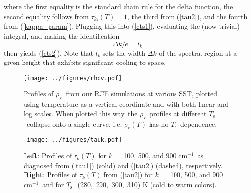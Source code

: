 \documentclass[10pt]{article}
\newcommand{\beqn}{\begin{equation}}
\newcommand{\eeqn}{\end{equation}}
\newcommand{\eqnref}[1]{(\ref{#1})}
\newcommand{\n}{\nonumber}
\newcommand{\der}[2]{\ensuremath{\frac{d #1}{d #2}}}
\newcommand{\ppz}{\ensuremath{\partial_z}}
\newcommand{\cminverse}{\ensuremath{\mathrm{cm^{-1}}}}
\newcommand{\rhov}{\ensuremath{\rho_\mathrm{v}}}
\newcommand{\Ts}{\ensuremath{T_\mathrm{s}}}
\newcommand{\gammaav}{\ensuremath{\Gamma_\mathrm{av}}}
\newcommand{\Kinverse}{\ensuremath{\mathrm{K^{-1}}}}
\begin{document}
where the first equality is the standard chain rule for the delta function, the second equality follows from $\tau_{k_1}(T)=1$, the third from \eqnref{tau2}, and the fourth from \eqnref{kappa_param}. Plugging this into \eqnref{cts1}, evaluating the (now trivial) integral, and making the identification 
	\beqn
		\Delta k/e = l_k
		\n
		\label{Deltak}
	\eeqn
	then yields \eqnref{cts2}. Note that $l_k$ sets the width $\Delta k$ of the spectral region at a given height that exhibits significant cooling to space.



	
\pagebreak

\begin{figure}[h]
	\begin{center}
			\texttt{[image: ../figures/rhov.pdf]}
		\caption{Profiles of \rhov\ from our RCE simulations at various SST, plotted using temperature as a vertical coordinate and with both linear and log scales. When plotted this way, the \rhov\ profiles at different \Ts\ collapse onto a single curve, i.e. $\rhov(T)$ has no \Ts\ dependence. 
		\label{rhov_fig}
		}
	\end{center}
\end{figure}


\begin{figure}[h]
	\begin{center}
			\texttt{[image: ../figures/tauk.pdf]}
		\caption{\textbf{Left}: Profiles of $\tau_k(T)$ for $k=$ 100, 500, and 900 \cminverse\ as diagnosed from \eqnref{tau1} (solid) and \eqnref{tau2} (dashed), respectively. \textbf{Right}: Profiles of $\tau_k(T)$ from \eqnref{tau2} for $k=$ 100, 500, and 900 \cminverse\ and for \Ts=(280,\ 290,\ 300,\ 310) K (cold to warm colors).
		\label{tauk}
		}
	\end{center}
\end{figure}
\end{document}
